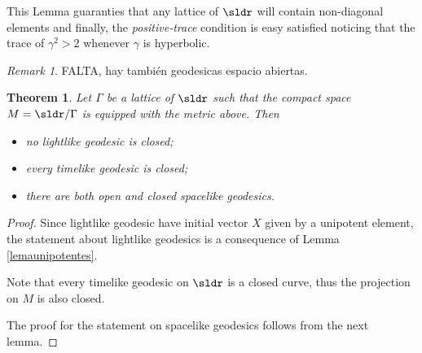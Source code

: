 \documentclass[11pt]{amsart}
\theoremstyle{plain}
\newtheorem{thm}{Theorem}[section]
\theoremstyle{definition}
\theoremstyle{remark}
\newtheorem{rem}{Remark}
\begin{document}
This Lemma guaranties that any lattice of $\sldr$ will contain non-diagonal elements and finally, the \textit{positive-trace} condition is easy satisfied noticing that the trace of $\gamma^2 > 2$ whenever $\gamma$ is hyperbolic.


\begin{rem}
FALTA, hay también geodesicas espacio abiertas.
\end{rem}

\begin{thm}\label{teoremasldr}
Let $\Gamma$ be a lattice of $\sldr$ such that the compact space $M=\sldr/\Gamma$ is equipped with the metric above. Then
\begin{itemize}
	\item  no lightlike geodesic  is closed;
	\item every timelike geodesic is closed;
	\item there are both open and closed spacelike geodesics.
\end{itemize}
\end{thm}

\begin{proof}
	Since lightlike geodesic have initial vector $X$ given by a unipotent element, the statement about lightlike geodesics is a consequence of Lemma \ref{lemaunipotentes}. 

	Note that  every timelike geodesic on $\sldr$ is a closed curve, thus the projection on $M$ is also closed.
	
	The proof for  the statement on spacelike geodesics follows from the next lemma. 
\end{proof}
\end{document}
